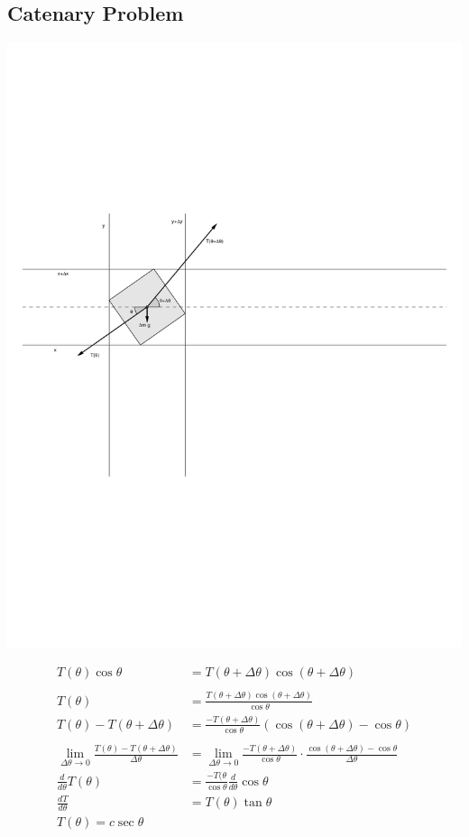 \documentclass{esg8012pset}
\begin{document}
\begin{question}[Problem 2]
\section*{Catenary Problem}
\begin{center}\includegraphics[width=.5\textwidth]{2009-09-25_Diagram_14}\end{center}

\begin{align*}
  T(\theta)\cos\theta & = T(\theta + \Delta \theta)\cos(\theta + \Delta \theta) \\
  \\
  T(\theta) & = \frac{T(\theta + \Delta \theta)\cos(\theta + \Delta \theta)}{\cos\theta} \\
  T(\theta) - T(\theta + \Delta\theta)& = \frac{-T(\theta + \Delta \theta)}{\cos\theta}(\cos(\theta + \Delta \theta) - \cos\theta) \\
  \\
  \lim_{\Delta\theta\rightarrow 0}\frac{T(\theta) - T(\theta + \Delta\theta)}{\Delta \theta} & = \lim_{\Delta\theta\rightarrow 0}\frac{-T(\theta + \Delta \theta)}{\cos\theta}\cdot \frac{\cos(\theta + \Delta \theta) - \cos\theta}{\Delta\theta} \\
  \frac{d}{d \theta}T(\theta) & = \frac{-T(\theta}{\cos\theta}\frac{d}{d\theta}\cos\theta \\
  \frac{d T}{d \theta} & = T(\theta)\tan\theta \\
  T(\theta) = c\sec \theta \\
  \\
  \\
\end{align*}









\end{question}
\end{document}
